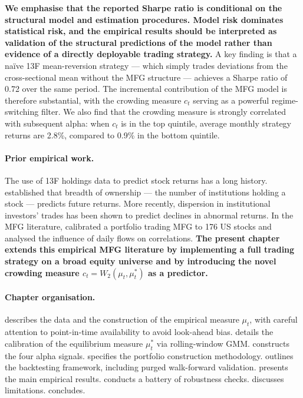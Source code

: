 \textbf{We emphasise that the reported Sharpe ratio is conditional on the structural
model and estimation procedures. Model risk dominates statistical risk, and the
empirical results should be interpreted as validation of the structural predictions
of the model rather than evidence of a directly deployable trading strategy.} A key
finding is that a na\"ive 13F mean-reversion strategy --- which simply trades
deviations from the cross-sectional mean without the MFG structure --- achieves a
Sharpe ratio of 0.72 over the same period. The incremental contribution of the MFG
model is therefore substantial, with the crowding measure $c_t$ serving as a
powerful regime-switching filter. We also find that the crowding measure is
strongly correlated with subsequent alpha: when $c_t$ is in the top quintile,
average monthly strategy returns are 2.8\%, compared to 0.9\% in the bottom
quintile.

\paragraph{Prior empirical work.} The use of 13F holdings data to predict stock
returns has a long history. \citep{chenhongstein2002} established that breadth
of ownership --- the number of institutions holding a stock --- predicts future
returns. More recently, dispersion in institutional investors' trades has been shown
to predict declines in abnormal returns. In the MFG literature, \citep{lehallemouzouni2019} calibrated a portfolio trading MFG to 176 US stocks and analysed the
influence of daily flows on correlations. \textbf{The present chapter extends this
empirical MFG literature by implementing a full trading strategy on a broad equity
universe and by introducing the novel crowding measure $c_t = W_2(\mu_t, \mu_t^*)$
as a predictor.}

\paragraph{Chapter organisation.}  describes the data and the
construction of the empirical measure $\mu_t$, with careful attention to
point-in-time availability to avoid look-ahead bias. 
details the calibration of the equilibrium measure $\mu_t^*$ via rolling-window
GMM.  constructs the four alpha signals.
 specifies the portfolio construction methodology.
 outlines the backtesting framework, including purged
walk-forward validation.  presents the main empirical
results.  conducts a battery of robustness checks.
 discusses limitations. 
concludes.


